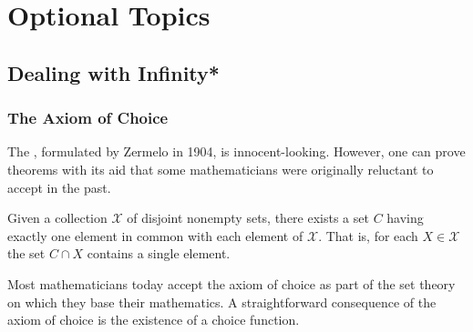\chapter{Optional Topics}

\section{Dealing with Infinity*}

\subsection{The Axiom of Choice}

The , formulated by Zermelo in 1904, is innocent-looking.
However, one can prove theorems with its aid that some mathematicians were originally reluctant to accept in the past.

\begin{definition}
Given a collection $\mathcal{X}$ of disjoint nonempty sets, there exists a set $C$ having exactly one element in common with each element of $\mathcal{X}$.
That is, for each $X \in \mathcal{X}$ the set $C \cap X$ contains a single element.
\end{definition}

Most mathematicians today accept the axiom of choice as part of the set theory on which they base their mathematics.
A straightforward consequence of the axiom of choice is the existence of a choice function.

